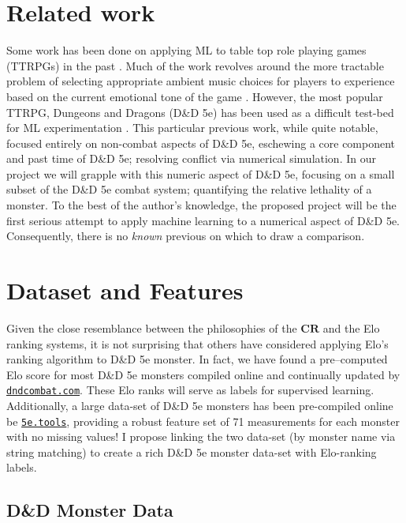 \documentclass{article}
\newcommand{\CR}{\ensuremath{\mathbf{CR}}\xspace}
\newcommand{\DnD}{D\&D 5e\xspace}
\begin{document}
\section{Related work}
Some work has been done on applying ML to table top role playing games (TTRPGs) in the past \cite{rameshkumar2020storytelling, macinnes2019d, cavanaugh2016machine, faria2019adaptive, riedl2013interactive}.
Much of the work revolves around the more tractable problem of selecting appropriate ambient music choices for players to experience based on the current emotional tone of the game \cite{ferreira2017mtg, risi2020increasing, padovani2017bardo, ferreira2020computer}.
However, the most popular TTRPG, Dungeons and Dragons (\DnD) has been used as a difficult test-bed for ML experimentation \cite{martin2018dungeons}.
This particular previous work, while quite notable, focused entirely on non-combat aspects of \DnD, eschewing a core component and past time of \DnD; resolving conflict via numerical simulation.
In our project we will grapple with this numeric aspect of \DnD, focusing on a small subset of the \DnD combat system; quantifying the relative lethality of a monster.
To the best of the author's knowledge, the proposed project will be the first serious attempt to apply machine learning to a numerical aspect of \DnD.
Consequently, there is no \emph{known} previous on which to draw a comparison.

\section{Dataset and Features}

Given the close resemblance between the philosophies of the \CR and the Elo ranking systems, it is not surprising that others have considered applying Elo's ranking algorithm to \DnD monster.
In fact, we have found a pre--computed Elo score for most \DnD monsters compiled online and continually updated by \href{https://www.dndcombat.com/dndcombat/Welcome.do?page=Compendium}{\texttt{dndcombat.com}}.
These Elo ranks will serve as labels for supervised learning.
Additionally, a large data-set of \DnD monsters has been pre-compiled online be \href{https://5etools-mirror-1.github.io/}{\texttt{5e.tools}}, providing a robust feature set of 71 measurements for each monster with no missing values!
I propose linking the two data-set (by monster name via string matching) to create a rich \DnD monster data-set with Elo-ranking labels.

\hypertarget{the-dd-monster-data}{%
\subsection{D\&D Monster Data}\label{the-dd-monster-data}}
\end{document}
